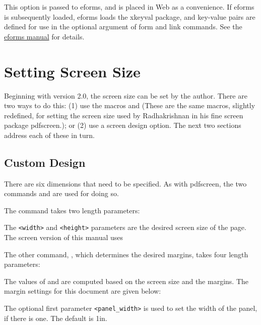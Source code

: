 \documentclass{article}
\def\Web{\textsf{Web}}
\begin{document}
This option is passed to \textsf{eforms}, and is placed in {\Web} as
a convenience. If \textsf{eforms} is subsequently loaded,
\textsf{eforms} loads the xkeyval package, and key-value pairs are
defined for use in the optional argument of form and link commands.
See the \href{eformman.pdf}{eforms manual} for details.

\section{Setting Screen Size}\label{s:setscreensize}

Beginning with version 2.0, the screen size can be set by the
author. There are two ways to do this: (1) use the macros
 and  (These are the same
macros, slightly redefined, for setting the screen size used by
Radhakrishnan in his fine screen package \textsf{pdfscreen}.); or (2) use
a screen design option. The next two sections address each of
these in turn.

\subsection{Custom Design}\label{cusDesign}

There are six dimensions that need to be specified. As with
\textsf{pdfscreen},  the two commands  and
 are used for doing so.

The command  takes two length parameters:
\begin{sverbatim}
\end{sverbatim}
\noindent The \texttt{<width>} and \texttt{<height>} parameters are the desired
screen size of the page. The screen version of this manual uses
\begin{sverbatim}
    \screensize{3.72in}{4.67in}
\end{sverbatim}
\noindent The other command, , which determines the desired
margins, takes four length parameters:
\begin{sverbatim}
\end{sverbatim}
\newtopic The values of  and  are computed
based on the screen size and the margins. The margin settings for
this document are given below:
\begin{sverbatim}
    \margins{.25in}{.25in}{30pt}{.25in}
\end{sverbatim}
\newtopic The optional first parameter \texttt{<panel\_width>} is used to set
the width of the panel, if there is one.  The default is 1in.
\end{document}
